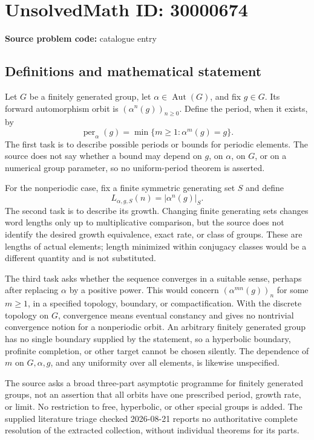 \documentclass[11pt]{article}
\begin{document}
\section*{UnsolvedMath ID: 30000674}
\textbf{Source problem code:} catalogue entry
\subsection{Definitions and mathematical statement}
Let \(G\) be a finitely generated group, let \(\alpha\in\operatorname{Aut}(G)\), and fix \(g\in G\). Its forward automorphism orbit is \((\alpha^n(g))_{n\geq0}\). Define the period, when it exists, by
\[
\operatorname{per}_\alpha(g)=\min\{m\geq1:\alpha^m(g)=g\}.
\]
The first task is to describe possible periods or bounds for periodic elements. The source does not say whether a bound may depend on \(g\), on \(\alpha\), on \(G\), or on a numerical group parameter, so no uniform-period theorem is asserted.

For the nonperiodic case, fix a finite symmetric generating set \(S\) and define
\[
L_{\alpha,g,S}(n)=|\alpha^n(g)|_S.
\]
The second task is to describe its growth. Changing finite generating sets changes word lengths only up to multiplicative comparison, but the source does not identify the desired growth equivalence, exact rate, or class of groups. These are lengths of actual elements; length minimized within conjugacy classes would be a different quantity and is not substituted.

The third task asks whether the sequence converges in a suitable sense, perhaps after replacing \(\alpha\) by a positive power. This would concern \((\alpha^{mn}(g))_n\) for some \(m\geq1\), in a specified topology, boundary, or compactification. With the discrete topology on \(G\), convergence means eventual constancy and gives no nontrivial convergence notion for a nonperiodic orbit. An arbitrary finitely generated group has no single boundary supplied by the statement, so a hyperbolic boundary, profinite completion, or other target cannot be chosen silently. The dependence of \(m\) on \(G,\alpha,g\), and any uniformity over all elements, is likewise unspecified.

The source asks a broad three-part asymptotic programme for finitely generated groups, not an assertion that all orbits have one prescribed period, growth rate, or limit. No restriction to free, hyperbolic, or other special groups is added. The supplied literature triage checked 2026-08-21 reports no authoritative complete resolution of the extracted collection, without individual theorems for its parts.
\end{document}
